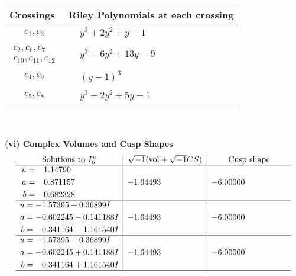 \documentclass[1p]{elsarticle_modified}
\theoremstyle{definition}
\newcommand{\I}{\sqrt{-1}}
\begin{document}
\begin{tabular}{m{50pt}|m{274pt}}
Crossings & \hspace{64pt}Riley Polynomials at each crossing \\
\hline $$\begin{aligned}c_{1},c_{3}\end{aligned}$$&$\begin{aligned}
&y^3+2 y^2+y-1
\end{aligned}$\\
\hline $$\begin{aligned}c_{2},c_{6},c_{7}\\c_{10},c_{11},c_{12}\end{aligned}$$&$\begin{aligned}
&y^3-6 y^2+13 y-9
\end{aligned}$\\
\hline $$\begin{aligned}c_{4},c_{9}\end{aligned}$$&$\begin{aligned}
&(y-1)^3
\end{aligned}$\\
\hline $$\begin{aligned}c_{5},c_{8}\end{aligned}$$&$\begin{aligned}
&y^3-2 y^2+5 y-1
\end{aligned}$\\
\hline
\end{tabular}\\~\\
\newpage\flushleft \textbf{(vi) Complex Volumes and Cusp Shapes}
$$\begin{array}{c|c|c}  
\text{Solutions to }I^u_{6}& \I (\text{vol} + \sqrt{-1}CS) & \text{Cusp shape}\\
 \hline 
\begin{aligned}
u &= \phantom{-}1.14790\phantom{ +0.000000I} \\
a &= \phantom{-}0.871157\phantom{ +0.000000I} \\
b &= -0.682328\phantom{ +0.000000I}\end{aligned}
 & -1.64493\phantom{ +0.000000I} & -6.00000\phantom{ +0.000000I} \\ \hline\begin{aligned}
u &= -1.57395 + 0.36899 I \\
a &= -0.602245 - 0.141188 I \\
b &= \phantom{-}0.341164 - 1.161540 I\end{aligned}
 & -1.64493\phantom{ +0.000000I} & -6.00000\phantom{ +0.000000I} \\ \hline\begin{aligned}
u &= -1.57395 - 0.36899 I \\
a &= -0.602245 + 0.141188 I \\
b &= \phantom{-}0.341164 + 1.161540 I\end{aligned}
 & -1.64493\phantom{ +0.000000I} & -6.00000\phantom{ +0.000000I}\\
 \hline 
 \end{array}$$\newpage\newpage\renewcommand{\arraystretch}{1}
\end{document}
